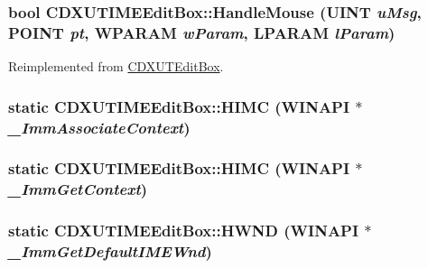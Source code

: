 \label{class_c_d_x_u_t_i_m_e_edit_box_ad919907a4c55dad632a9195b49c63765}
\hypertarget{class_c_d_x_u_t_i_m_e_edit_box_a02795ef1096e7a276afdc501c606eab9}{
\subsubsection[{HandleMouse}]{\setlength{\rightskip}{0pt plus 5cm}bool CDXUTIMEEditBox::HandleMouse ({\bf UINT} {\em uMsg}, \/  POINT {\em pt}, \/  WPARAM {\em wParam}, \/  LPARAM {\em lParam})}}
\label{class_c_d_x_u_t_i_m_e_edit_box_a02795ef1096e7a276afdc501c606eab9}


Reimplemented from \hyperlink{class_c_d_x_u_t_edit_box_afadff4a882c187926a7b8173eb7d97cc}{CDXUTEditBox}.\hypertarget{class_c_d_x_u_t_i_m_e_edit_box_a933f71681cd58fae53c1ee3cb04d5484}{
\subsubsection[{HIMC}]{\setlength{\rightskip}{0pt plus 5cm}static {\bf CDXUTIMEEditBox::HIMC} (WINAPI $\ast$ {\em \_\-ImmAssociateContext})}}
\label{class_c_d_x_u_t_i_m_e_edit_box_a933f71681cd58fae53c1ee3cb04d5484}
\hypertarget{class_c_d_x_u_t_i_m_e_edit_box_a0811d012d7ddb5d3384cdea1beb5aa68}{
\subsubsection[{HIMC}]{\setlength{\rightskip}{0pt plus 5cm}static {\bf CDXUTIMEEditBox::HIMC} (WINAPI $\ast$ {\em \_\-ImmGetContext})}}
\label{class_c_d_x_u_t_i_m_e_edit_box_a0811d012d7ddb5d3384cdea1beb5aa68}
\hypertarget{class_c_d_x_u_t_i_m_e_edit_box_a383dbe71ad7fe88f3a4b2e6bfd588ca4}{
\subsubsection[{HWND}]{\setlength{\rightskip}{0pt plus 5cm}static CDXUTIMEEditBox::HWND (WINAPI $\ast$ {\em \_\-ImmGetDefaultIMEWnd})}}
